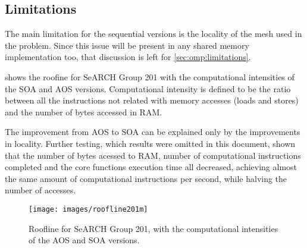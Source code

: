 \subsection{Limitations}

The main limitation for the sequential versions is the locality of the mesh used in the problem. Since this issue will be present in any shared memory implementation too, that discussion is left for \cref{sec:omp:limitations}.

 shows the roofine for SeARCH Group 201 with the computational intensities of the SOA and AOS versions. Computational intensity is defined to be the ratio between all the instructions not related with memory accesses (loads and stores) and the number of bytes accessed in RAM.

The improvement from AOS to SOA can be explained only by the improvements in locality. Further testing, which results were omitted in this document, shown that the number of bytes acessed to RAM, number of computational instructions completed and the core functions execution time all decreased, achieving almost the same amount of computational instructions per second, while halving the number of accesses.

\begin{figure}
	\centering
	\texttt{[image: images/roofline201m]}
	\caption{Roofline for SeARCH Group 201, with the computational intensities of the AOS and SOA versions.}
	\label{fig:roofline201}
\end{figure}
